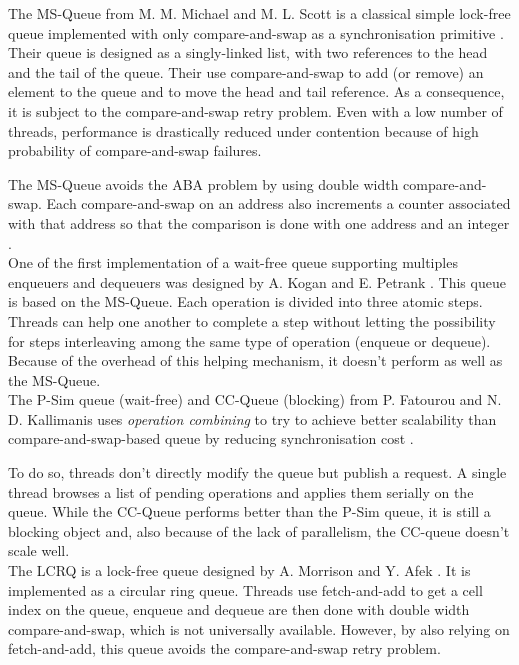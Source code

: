  The MS-Queue from M. M. Michael and M. L. Scott is a classical
simple lock-free queue implemented with only compare-and-swap as a
synchronisation primitive \cite{Michael96simple}. Their queue is designed as a
singly-linked list, with two references to the head and the tail of the queue.
Their use compare-and-swap to add (or remove) an element to the queue and to
move the head and tail reference. As a consequence, it is subject to the
compare-and-swap retry problem. Even with a low number of threads, performance
is drastically reduced under contention because of high probability of
compare-and-swap failures.

The MS-Queue avoids the ABA problem by using double width compare-and-swap. Each
compare-and-swap on an address also increments a counter associated with that
address so that the comparison is done with one address and an integer
\cite{Herlihy08} \cite{Michael96simple}. \\

 One of the first implementation of a wait-free
queue supporting multiples enqueuers and dequeuers was designed by A. Kogan and
E. Petrank \cite{Kogan:2011:WQM:2038037.1941585}. This queue is based on the
MS-Queue. Each operation is divided into three atomic steps. Threads can help
one another to complete a step without letting the possibility for steps
interleaving among the same type of operation (enqueue or dequeue). Because of
the overhead of this helping mechanism, it doesn't perform as well as the
MS-Queue. \\

 The P-Sim queue (wait-free) and CC-Queue (blocking)
from P. Fatourou and N. D. Kallimanis uses \textit{operation combining} to try
to achieve better scalability than compare-and-swap-based queue by reducing
synchronisation cost \cite{Fatourou:2011:HWU:1989493.1989549}
\cite{Fatourou:2012:RCS:2370036.2145849}.

To do so, threads don't directly modify the queue but publish a request. A
single thread browses a list of pending operations and applies them serially on
the queue. While the CC-Queue performs better than the P-Sim queue, it is still
a blocking object and, also because of the lack of parallelism, the CC-queue
doesn't scale well. \\

 The LCRQ is a lock-free queue designed by A. Morrison
and Y. Afek \cite{Morrison:2013:FCQ:2517327.2442527}. It is implemented as a
circular ring queue. Threads use fetch-and-add to get a cell index on the queue,
enqueue and dequeue are then done with double width compare-and-swap, which is
not universally available. However, by also relying on fetch-and-add, this queue
avoids the compare-and-swap retry problem. \\

